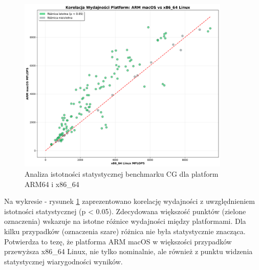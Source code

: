 \begin{figure}[H]
    \centering
    \includegraphics[width=0.9\textwidth]{analiza/images/parallel/cg/compare/cg_analiza_istotnosci_statystycznej.png}
    \caption{Analiza istotności statystycznej benchmarku CG dla platform ARM64 i x86\_64}
    \label{cg_analiza_istotnosci_statystycznej}
\end{figure}
Na wykresie - rysunek \ref{cg_analiza_istotnosci_statystycznej} zaprezentowano korelację wydajności z uwzględnieniem istotności statystycznej (p < 0.05). Zdecydowana większość punktów (zielone oznaczenia) wskazuje na istotne różnice wydajności między platformami. Dla kilku przypadków (oznaczenia szare) różnica nie była statystycznie znacząca. Potwierdza to tezę, że platforma ARM macOS w większości przypadków przewyższa x86\_64 Linux, nie tylko nominalnie, ale również z punktu widzenia statystycznej wiarygodności wyników.